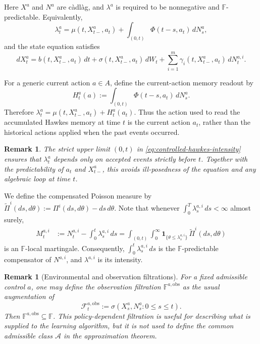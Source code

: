\documentclass[11pt]{article}
\theoremstyle{remarkitalic}
\theoremstyle{remarkitalic}
\newtheorem{remark}[theorem]{Remark}
\newcommand{\1}{\mathbf 1}
\begin{document}
\noindent Here $X^a$ and $N^a$ are c\`adl\`ag, and $\lambda^a$ is required to be
nonnegative and $\mathbb{F}$-predictable. Equivalently,
\begin{equation}
\label{eq:controlled-hawkes-intensity}
\lambda_t^a
=
\mu(t,X_{t-}^a,a_t)
+
\int_{(0,t)}\Phi(t-s,a_t)\,dN_s^a,
\end{equation}
and the state equation satisfies
\[
dX_t^a
=
b(t,X_{t-}^a,a_t)\,dt
+\sigma(t,X_{t-}^a,a_t)\,dW_t
+\sum_{i=1}^m
\gamma_i(t,X_{t-}^a,a_t)\,dN_t^{a,i}.
\]

For a generic current action $a\in A$, define the current-action memory
readout by
\begin{equation}
\label{eq:current-action-memory}
H_t^a(a)
:=
\int_{(0,t)}\Phi(t-s,a_t)\,dN_s^a.
\end{equation}
Therefore
$\lambda_t^a
=
\mu(t,X_{t-}^a,a_t)+H_t^a(a_t).$
Thus the action used to read the accumulated Hawkes memory at time $t$
is the current action $a_t$, rather than the historical actions applied
when the past events occurred.

\begin{remark}
The strict upper limit $(0,t)$ in
\eqref{eq:controlled-hawkes-intensity} ensures that
$\lambda_t^a$ depends only on accepted events strictly before $t$.
Together with the predictability of $a_t$ and $X_{t-}^a$, this avoids ill-posedness of the equation and any algebraic loop at time $t$.
\end{remark}
We define the compensated Poisson measure by
$
\widetilde\Pi^i(ds,d\theta)
:=
\Pi^i(ds,d\theta)-ds\,d\theta.$
Note that whenever $\int_0^T\lambda_s^{a,i}\,ds<\infty$ almost surely,
\begin{equation}
\label{eq:compensated-hawkes-martingale}
\begin{aligned}
M_t^{a,i}
&:=N_t^{a,i}-\int_0^t\lambda_s^{a,i}\,ds=
\int_{(0,t)}\int_0^\infty
\mathbf{1}_{\{\theta\leq\lambda_s^{a,i}\}}
\,\widetilde\Pi^i(ds,d\theta)
\end{aligned}
\end{equation}
is an $\mathbb{F}$-local martingale. Consequently,
$\int_0^t\lambda_s^{a,i}\,ds$ is the $\mathbb{F}$-predictable
compensator of $N^{a,i}$, and $\lambda^{a,i}$ is its intensity.
\begin{remark}[Environmental and observation filtrations]
\label{rem:environment-observation-filtrations}
For a fixed admissible control $a$, one may define the observation
filtration $\mathbb{F}^{a,\mathrm{obs}}$ as the usual augmentation of
\[
\mathcal{F}^{a,\mathrm{obs}}_t
:=
\sigma\!\left(
X_s^a,N_s^a:0\leq s\leq t
\right).
\]
Then $\mathbb{F}^{a,\mathrm{obs}}\subseteq\mathbb{F}$. This
policy-dependent filtration is useful for describing what is supplied
to the learning algorithm, but it is not used to define the common
admissible class $\mathcal A$ in the approximation theorem.
\end{remark} 
\end{document}
